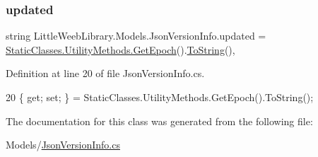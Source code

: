 \subsubsection{\texorpdfstring{updated}{updated}}
{\footnotesize\ttfamily string Little\+Weeb\+Library.\+Models.\+Json\+Version\+Info.\+updated = \mbox{\hyperlink{class_little_weeb_library_1_1_static_classes_1_1_utility_methods_a12336d9e64983ddabaad8950486fafb2}{Static\+Classes.\+Utility\+Methods.\+Get\+Epoch}}().\mbox{\hyperlink{class_little_weeb_library_1_1_models_1_1_json_version_info_a72efae30c86f1e6baaef42065127bdd2}{To\+String}}()\hspace{0.3cm}{\ttfamily [get]}, {\ttfamily [set]}}



Definition at line 20 of file Json\+Version\+Info.\+cs.


\begin{DoxyCode}
20 \{ \textcolor{keyword}{get}; \textcolor{keyword}{set}; \} = StaticClasses.UtilityMethods.GetEpoch().ToString();
\end{DoxyCode}


The documentation for this class was generated from the following file\+:\begin{DoxyCompactItemize}
\item 
Models/\mbox{\hyperlink{_json_version_info_8cs}{Json\+Version\+Info.\+cs}}\end{DoxyCompactItemize}
